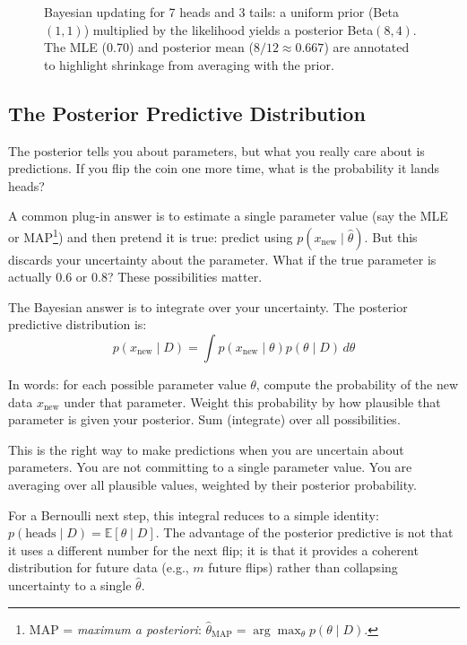 \begin{figure}[t]
\centering

\caption{Bayesian updating for 7 heads and 3 tails: a uniform prior (Beta$(1,1)$) multiplied by the likelihood yields a posterior Beta$(8,4)$. The MLE (0.70) and posterior mean ($8/12\approx0.667$) are annotated to highlight shrinkage from averaging with the prior.}
\label{fig:bayesian_update}
\end{figure}

\subsection{The Posterior Predictive Distribution}

The posterior tells you about parameters, but what you really care about is predictions. If you flip the coin one more time, what is the probability it lands heads?

A common plug-in answer is to estimate a single parameter value (say the MLE or MAP\footnote{MAP = \emph{maximum a posteriori}: $\hat{\theta}_{\text{MAP}}=\arg\max_\theta p(\theta\mid D)$.}) and then pretend it is true: predict using $p(x_{\text{new}}\mid \hat{\theta})$. But this discards your uncertainty about the parameter. What if the true parameter is actually 0.6 or 0.8? These possibilities matter.

The Bayesian answer is to integrate over your uncertainty. The posterior predictive distribution is:
\begin{equation}
p(x_{\text{new}} \mid D) = \int p(x_{\text{new}} \mid \theta) p(\theta \mid D) \, d\theta
\end{equation}

In words: for each possible parameter value $\theta$, compute the probability of the new data $x_{\text{new}}$ under that parameter. Weight this probability by how plausible that parameter is given your posterior. Sum (integrate) over all possibilities.

This is the right way to make predictions when you are uncertain about parameters. You are not committing to a single parameter value. You are averaging over all plausible values, weighted by their posterior probability.

For a Bernoulli next step, this integral reduces to a simple identity: $p(\text{heads}\mid D)=\mathbb{E}[\theta\mid D]$. The advantage of the posterior predictive is not that it uses a different number for the next flip; it is that it provides a coherent distribution for future data (e.g., $m$ future flips) rather than collapsing uncertainty to a single $\hat{\theta}$.

